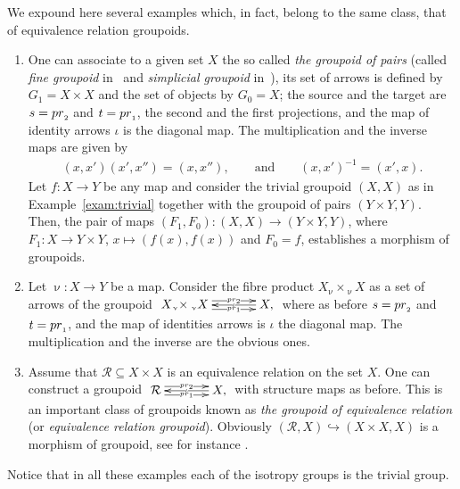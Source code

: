 \documentclass[11pt]{article}
\numberwithin{equation}{section}
\newcommand{\cR}{{\mathcal R}}
\newcommand{\Sscript}[1]{\scriptscriptstyle{#1}}
\newcommand{\due}[3]{{}_{{#2 }} {#1}_{{ #3}} }
\begin{document}
\begin{Example}\label{exam:X} We expound here several examples which, in fact, belong to the same class, that of equivalence relation groupoids.
\begin{enumerate}[(1)]\itemsep=0pt
\item One can associate to a given set $X$ the so called \emph{the groupoid of pairs} (called \emph{fine groupoid} in~\cite{Brown:1987} and \emph{simplicial groupoid} in~\cite{Higgins:1971}), its set of arrows is defined by $G_{\Sscript{1}}=X \times X$ and the set of objects by $G_{\Sscript{0}}=X$; the source and the target are $s={\rm pr}_{\Sscript{2}}$ and $t={\rm pr}_{\Sscript{1}}$, the second and the first projections, and the map of identity arrows $\iota$ is the diagonal map. The multiplication and the inverse maps are given by
\begin{gather*}
(x,x') (x',x'') = (x,x''),\qquad \text{and} \qquad (x,x')^{-1} = (x',x).
\end{gather*}
Let $f\colon X\to Y$ be any map and consider the trivial groupoid $(X,X)$ as in Example~\ref{exam:trivial} together with the groupoid of pairs $(Y \times Y, Y)$. Then, the pair of maps
$(F_{\Sscript{1}}, F_{\Sscript{0}})\colon (X,X) \to (Y\times Y, Y)$, where $F_{\Sscript{1}}\colon X \to Y\times Y$, $x \mapsto (f(x), f(x))$ and $F_{\Sscript{0}}=f$, establishes a morphism of groupoids.

\item Let $\upnu\colon X \to Y$ be a map. Consider the fibre product $X \due \times {\Sscript{\upnu}} {\; \Sscript{\upnu}} X$ as a set of arrows of the groupoid $\xymatrix@C=35pt{ X \due \times {\Sscript{\upnu}} {\; \Sscript{\upnu}} X \ar@<0.8ex>@{->}|-{\scriptscriptstyle{{\rm pr}_2}}[r] \ar@<-0.8ex>@{->}|-{\scriptscriptstyle{{\rm pr}_1}}[r] & \ar@{->}|-{ \scriptscriptstyle{\iota}}[l] X, }$ where as before $s={\rm pr}_{\Sscript{2}}$ and $t={\rm pr}_{\Sscript{1}}$, and the map of identities arrows is $\iota$ the diagonal map. The multiplication and the inverse are the obvious ones.

\item Assume that $\cR \subseteq X \times X$ is an equivalence relation on the set $X$. One can construct a groupoid
$\xymatrix@C=35pt{\cR \ar@<0.8ex>@{->}|-{\scriptscriptstyle{{\rm pr}_2}}[r] \ar@<-0.8ex>@{->}|-{\scriptscriptstyle{{\rm pr}_1}}[r] & \ar@{->}|-{\scriptscriptstyle{\iota}}[l] X, }$ with structure maps as before. This is an important class of groupoids known as \emph{the groupoid of equivalence relation} (or \emph{equivalence relation groupoid}). Obviously $(\cR, X) \hookrightarrow (X\times X, X)$ is a morphism of groupoid, see for instance \cite[Example~1.4, p.~301]{DemGab:GATIGAGGC}.
\end{enumerate}
Notice that in all these examples each of the isotropy groups is the trivial group.
\end{Example}
\end{document}
